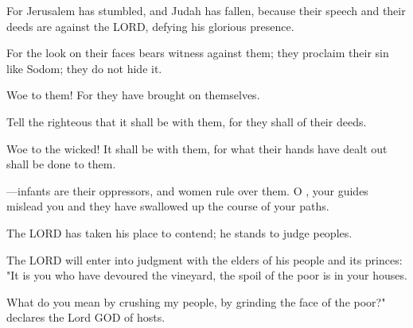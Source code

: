 \documentclass[11pt]{article}
\begin{document}
\begin{biblicaloutline}[Isaiah 3:8-15]


\begin{versesection}{2em}
 For Jerusalem has stumbled,
\poetryline and Judah has fallen,
because their speech and their deeds are against the LORD,
\poetryline defying his glorious presence.

 For the look on their faces bears witness against them;
\poetryline they proclaim their sin like Sodom;
\poetryline they do not hide it.
\end{versesection}


\begin{versesection}{2em}
 Woe to them!
\poetryline For they have brought  on themselves.

 Tell the righteous that it shall be  with them,
\poetryline for they shall  of their deeds.

 Woe to the wicked! It shall be  with them,
\poetryline for what their hands have dealt out shall be done to them.

 —infants are their oppressors,
\poetryline and women rule over them.
O , your guides mislead you
\poetryline and they have swallowed up the course of your paths.
\end{versesection}


\begin{versesection}{2em}
 The LORD has taken his place to contend;
\poetryline he stands to judge peoples.

 The LORD will enter into judgment
\poetryline with the elders of his people and its princes:
"It is you who have devoured the vineyard,
\poetryline the spoil of the poor is in your houses.

 What do you mean by crushing my people,
\poetryline by grinding the face of the poor?"
declares the Lord GOD of hosts.
\end{versesection}

\end{biblicaloutline}
\end{document}
